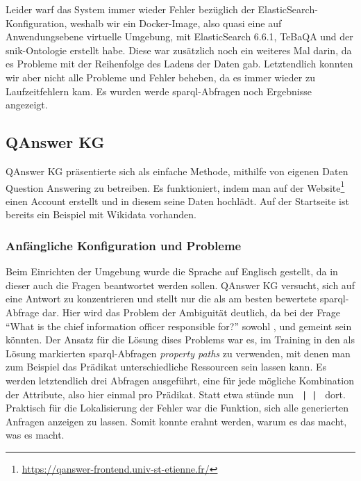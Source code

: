 Leider warf das System immer wieder Fehler bezüglich der ElasticSearch-Konfiguration, weshalb wir ein Docker-Image,
also quasi eine auf Anwendungsebene virtuelle Umgebung, mit ElasticSearch 6.6.1, TeBaQA und der \ac{snik}-Ontologie erstellt habe.
Diese war zusätzlich noch ein weiteres Mal darin, da es Probleme mit der Reihenfolge des Ladens der Daten gab.
Letztendlich konnten wir aber nicht alle Probleme und Fehler beheben, da es immer wieder zu Laufzeitfehlern kam.
Es wurden werde \ac{sparql}-Abfragen noch Ergebnisse angezeigt.

\subsection{QAnswer KG}

QAnswer KG präsentierte sich als einfache Methode, mithilfe von eigenen Daten Question Answering zu betreiben.
Es funktioniert, indem man auf der Website\footnote{\url{https://qanswer-frontend.univ-st-etienne.fr/}} einen Account erstellt und in diesem seine Daten hochlädt.
Auf der Startseite ist bereits ein Beispiel mit Wikidata vorhanden.

\subsubsection{Anfängliche Konfiguration und Probleme}

Beim Einrichten der Umgebung wurde die Sprache auf Englisch gestellt, da in dieser auch die Fragen beantwortet werden sollen.
QAnswer KG versucht, sich auf eine Antwort zu konzentrieren und stellt nur die als am besten bewertete \ac{sparql}-Abfrage dar.
Hier wird das Problem der Ambiguität deutlich, da bei der Frage \enquote{What is the chief information officer responsible for?} sowohl
,  und  gemeint sein könnten.
Der Ansatz für die Lösung dises Problems war es, im Training in den als Lösung markierten \ac{sparql}-Abfragen \emph{property paths} zu verwenden,
mit denen man zum Beispiel das Prädikat unterschiedliche Ressourcen sein lassen kann.
Es werden letztendlich drei Abfragen ausgeführt, eine für jede mögliche Kombination der Attribute, also hier einmal pro Prädikat.
Statt etwa \texttt{} stünde nun \texttt{ |  | } dort.
Praktisch für die Lokalisierung der Fehler war die Funktion, sich alle generierten Anfragen anzeigen zu lassen.
Somit konnte erahnt werden, warum es das macht, was es macht.

